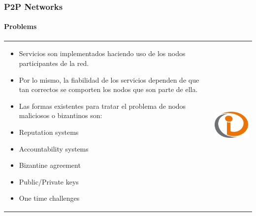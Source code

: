 \begin{frame}
\frametitle{P2P Networks}
\framesubtitle{Problems}
\begin{table}
\begin{tabular}{p{7cm}p{3cm}}
\begin{itemize}
  \item Servicios son implementados haciendo uso de los nodos participantes de la red.
  \item Por lo mismo, la fiabilidad de los servicios dependen de que tan correctos se comporten los nodos que son parte de ella.
  \item Las formas existentes para tratar el problema de nodos maliciosos o bizantinos son:
    \item Reputation systems
    \item Accountability systems
    \item Bizantine agreement
    \item Public/Private keys
    \item One time challenges
\end{itemize}
&
\vspace{1.5cm}
\includegraphics[width=4cm]{img/example}\\
\end{tabular}
\end{table}
\end{frame}


